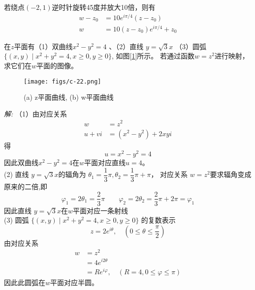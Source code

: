 若绕点$(-2,1)$逆时针旋转45度并放大10倍，则有
\[ \begin{aligned}
    w-z_0 &= 10 e^{i\pi /4}(z-z_0) \\
    w &=  10 (z-z_0)e^{i\pi /4} + z_0
\end{aligned} \]    

\begin{example}
    在$z$平面有（1）双曲线$x^2 - y^2 =4$ 、（2）直线 $ y= \sqrt{3} x $ （3）圆弧 $\{(x,y) \mid x^2 + y^2 =4, x \ge 0, y \ge 0 \}$, 如图[\ref{fig:threetran}]所示。
	若通过函数$w= z^2 $进行映射，求它们在$w$平面的图像。
    \begin{figure}[htbp]
     \centering
     \texttt{[image: figs/c-22.png]}
     \caption{(a) z平面曲线, (b) w平面曲线}
     \label{fig:threetran}
    \end{figure}
\end{example}
\emph{解:} （1）由对应关系
\[ \begin{aligned}
    w &=z^2 \\ 
    u+v i &= (x^2 -y^2) + 2 xy i 
\end{aligned}\]
得 $$u = x^2 -y^2 =4$$
因此双曲线$x^2 -y^2 =4$在$w$平面对应直线$u=4$。\\
(2) 直线 $ y= \sqrt{3} x $的辐角为 $\theta _1 = \dfrac{1}{3} \pi, \theta _2 = \dfrac{1}{3} \pi + \pi $，
对应关系 $w =z^2 $要求辐角变成原来的二倍,即
$$\varphi _1  =  2 \theta _1 = \frac{2}{3} \pi \qquad \varphi _2 = 2 \theta _2 = \frac{2}{3} \pi + 2\pi = \varphi _1 $$
因此直线 $ y= \sqrt{3} x $在$w$平面对应一条射线 \\
(3) 圆弧 $\{(x,y) \mid x^2 + y^2 =4, x \ge 0, y \ge 0 \}$ 的复数表示
\[ z= 2 e^{i \theta}, \quad  (0 \le \theta \le \frac{\pi}{2}) \]
由对应关系
\[ \begin{aligned}
    w &=z^2 \\ 
    &= 4 e^{i 2 \theta} \\
    &= R e^{i \varphi}, \quad ( R=4, 0 \le  \varphi \le \pi)
\end{aligned}\]
因此此圆弧在$w$平面对应半圆。\\

